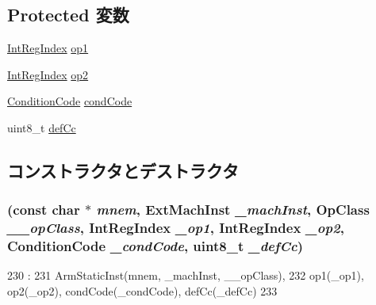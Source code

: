 \subsection*{Protected 変数}
\begin{DoxyCompactItemize}
\item 
\hyperlink{namespaceArmISA_ae64680ba9fb526106829d6bf92fc791b}{IntRegIndex} \hyperlink{classArmISA_1_1DataXCondCompRegOp_a4c465c43ad568f8bcf8ae71480e9cfea}{op1}
\item 
\hyperlink{namespaceArmISA_ae64680ba9fb526106829d6bf92fc791b}{IntRegIndex} \hyperlink{classArmISA_1_1DataXCondCompRegOp_a7799ff6cbe5a252199059eb8665820e7}{op2}
\item 
\hyperlink{namespaceArmISA_ab8f08e777c4753720cff841f81da8e06}{ConditionCode} \hyperlink{classArmISA_1_1DataXCondCompRegOp_a273dc0fe84de8f4a9cf52aaf8dc27885}{condCode}
\item 
uint8\_\-t \hyperlink{classArmISA_1_1DataXCondCompRegOp_a67b4730d4f641c62c31e1b7724f93433}{defCc}
\end{DoxyCompactItemize}


\subsection{コンストラクタとデストラクタ}
\hypertarget{classArmISA_1_1DataXCondCompRegOp_acac78d84979432cdba96853039a6edfd}{
\subsubsection[{DataXCondCompRegOp}]{ (const char $\ast$ {\em mnem}, \/  {\bf ExtMachInst} {\em \_\-machInst}, \/  OpClass {\em \_\-\_\-opClass}, \/  {\bf IntRegIndex} {\em \_\-op1}, \/  {\bf IntRegIndex} {\em \_\-op2}, \/  {\bf ConditionCode} {\em \_\-condCode}, \/  uint8\_\-t {\em \_\-defCc})}}
\label{classArmISA_1_1DataXCondCompRegOp_acac78d84979432cdba96853039a6edfd}



\begin{DoxyCode}
230                                                                 :
231         ArmStaticInst(mnem, _machInst, __opClass),
232         op1(_op1), op2(_op2), condCode(_condCode), defCc(_defCc)
233     {}

\end{DoxyCode}


